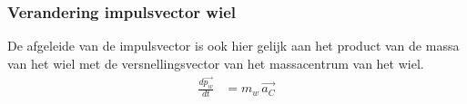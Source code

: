 \subsubsection{Verandering impulsvector wiel}
De afgeleide van de impulsvector is ook hier gelijk aan het product van de massa van het wiel met de versnellingsvector van het massacentrum van het wiel.
\begin{equation}
\begin{split}
\frac{d\overrightarrow{{p}_{w}}}{dt}
&=m_{w}\,\overrightarrow{{a}_{C}}
\end{split}
\end{equation}